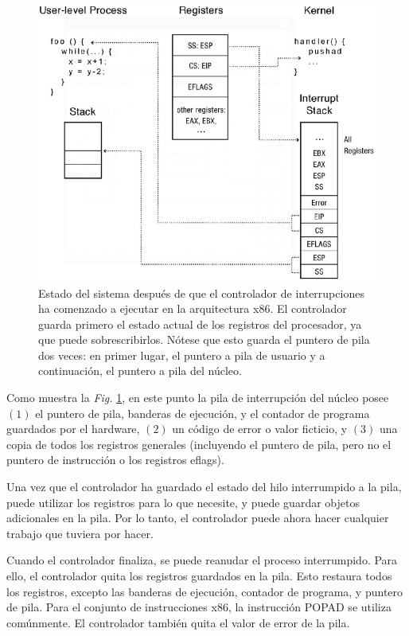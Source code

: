 \documentclass[10pt]{book}
\begin{document}
\begin{figure}[tbhp]
\centerline{\includegraphics[scale=0.55]{img/fig0208}}
\caption{Estado del sistema después de que el controlador de interrupciones ha comenzado a ejecutar en la arquitectura {\mf x86}. El controlador guarda primero el estado actual de los registros del procesador, ya que puede sobrescribirlos. Nótese que esto guarda el puntero de pila dos veces: en primer lugar, el puntero a pila de usuario y a continuación, el puntero a pila del núcleo.}
\label{fig0208}
\end{figure}

Como muestra la \textit{Fig.} \ref{fig0208}, en este punto la pila de interrupción del núcleo posee $(1)$ el puntero de pila, banderas de ejecución, y el contador de programa guardados por el hardware, $(2)$ un código de error o valor ficticio, y $(3)$ una copia de todos los registros generales (incluyendo el puntero de pila, pero no el puntero de instrucción o los registros {\mf eflags}).

Una vez que el controlador ha guardado el estado del hilo interrumpido a la pila, puede utilizar los registros para lo que necesite, y puede guardar objetos adicionales en la pila. Por lo tanto, el controlador puede ahora hacer cualquier trabajo que tuviera por hacer.

Cuando el controlador finaliza, se puede reanudar el proceso interrumpido. Para ello, el controlador quita los registros guardados en la pila. Esto restaura todos los registros, excepto las banderas de ejecución, contador de programa, y puntero de pila. Para el conjunto de instrucciones {\mf x86}, la instrucción {\mf POPAD} se utiliza comúnmente. El controlador también quita el valor de error de la pila.
\end{document}

